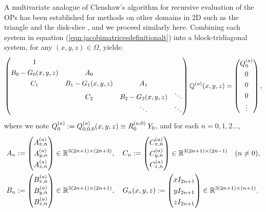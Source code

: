 \documentclass[11pt, oneside]{article}   	%
\begin{document}
A multivariate analogue of Clenshaw's algorithm for recursive evaluation of the OPs has been established for methods on other domains in 2D such as the triangle \cite{olver2019triangle} and the disk-slice \cite{snowball2019sparse}, and we proceed similarly here. Combining each system in equation (\ref{eqn:jacobimatricesdefinitionalt}) into a block-tridiagonal system, for any $(x,y,z) \in \Omega$, yields:
\begin{align*}
	\renewcommand\arraystretch{1.3}
	\begin{pmatrix}
		1 & & & \\
		B_0-G_0(x,y,z) & A_0 & & \\
		C_1 & B_1-G_1(x,y,z) & \quad A_1 \quad & \\
		& C_2 & B_2 - G_2(x,y,z)  & \ddots \\
		& & \ddots &\ddots
	\end{pmatrix}
	\bigscopta(x,y,z) =
		\begin{pmatrix}
	 		\scopa_0 \\ 0 \\ 0 \\ 0 \\ \vdots  \\
		\end{pmatrix},
\end{align*}
where we note $Q^{(a)}_0 := Q^{(a)}_{0,0,0}(x,y,z) \equiv R_0^{(a,0)} \: Y_0$, and for each $n = 0,1,2\dots$,
\begin{align*}
	A_n &:= 
		\begin{pmatrix}
			A^{(a)}_{x,n} \\
			A^{(a)}_{y,n} \\
			A^{(a)}_{z,n}
		\end{pmatrix} \in \R^{3(2n+1)\times(2n+3)}, \quad
	C_n := 
		\begin{pmatrix}
			C^{(a)}_{x,n} \\
			C^{(a)}_{y,n} \\
			C^{(a)}_{z,n}
		\end{pmatrix} \in \R^{3(2n+1)\times(2n-1)} \quad (n \ne 0), \nonumber \\
	B_n &:= 
		\begin{pmatrix}
			B^{(a)}_{x,n} \\
			B^{(a)}_{y,n} \\
			B^{(a)}_{z,n}
		\end{pmatrix} \in \R^{3(2n+1)\times(2n+1)}, \quad
	G_n(x,y,z) := 
		\begin{pmatrix}
			xI_{2n+1} \\
			yI_{2n+1} \\
			zI_{2n+1}
		\end{pmatrix} \in \R^{3(2n+1)\times(n+1)}.
\end{align*}
 
\end{document}
